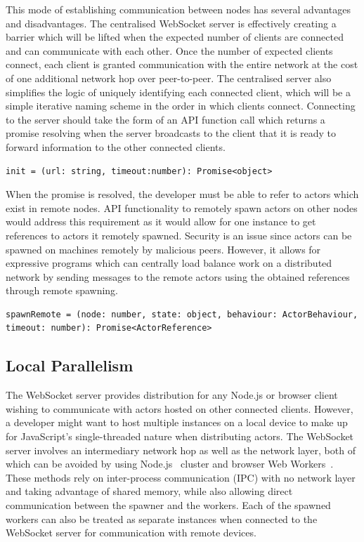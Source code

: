 \documentclass[12pt, a4paper]{report}
\theoremstyle{definition}
\theoremstyle{definition}%
\theoremstyle{definition}%
\theoremstyle{definition}%
\theoremstyle{definition}%
\theoremstyle{definition}%
\begin{document}
This mode of establishing communication between nodes has several advantages and disadvantages. The centralised WebSocket server is effectively creating a barrier which will be lifted when the expected number of clients are connected and can communicate with each other. Once the number of expected clients connect, each client is granted communication with the entire network at the cost of one additional network hop over peer-to-peer. The centralised server also simplifies the logic of uniquely identifying each connected client, which will be a simple iterative naming scheme in the order in which clients connect. Connecting to the server should take the form of an API function call which returns a promise resolving when the server broadcasts to the client that it is ready to forward information to the other connected clients.
\begin{lstlisting}
init = (url: string, timeout:number): Promise<object>
\end{lstlisting}
When the promise is resolved, the developer must be able to refer to actors which exist in remote nodes. API functionality to remotely spawn actors on other nodes would address this requirement as it would allow for one instance to get references to actors it remotely spawned. Security is an issue since actors can be spawned on machines remotely by malicious peers. However, it allows for expressive programs which can centrally load balance work on a distributed network by sending messages to the remote actors using the obtained references through remote spawning.
\begin{lstlisting}
spawnRemote = (node: number, state: object, behaviour: ActorBehaviour, timeout: number): Promise<ActorReference>
\end{lstlisting}
\subsection{Local Parallelism}
The WebSocket server provides distribution for any Node.js or browser client wishing to communicate with actors hosted on other connected clients. However, a developer might want to host multiple instances on a local device to make up for JavaScript's single-threaded nature when distributing actors. The WebSocket server involves an intermediary network hop as well as the network layer, both of which can be avoided by using Node.js~\cite{nodejs} cluster and browser Web Workers~\cite{webworkers}. These methods rely on inter-process communication (IPC) with no network layer and taking advantage of shared memory, while also allowing direct communication between the spawner and the workers. Each of the spawned workers can also be treated as separate instances when connected to the WebSocket server for communication with remote devices.
\end{document}
